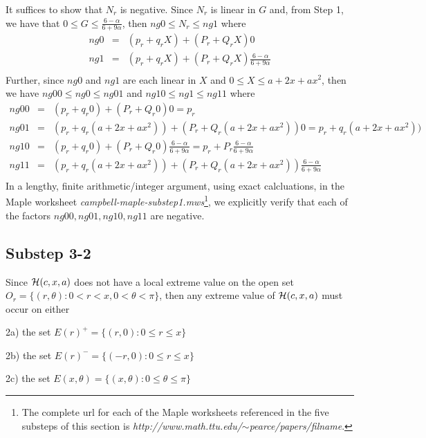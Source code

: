 \documentclass[12pt]{article}
\newcommand{\ds}{\displaystyle}
\begin{document}
It suffices to show that $N_r$ is negative. Since $N_r$ is linear in $G$ and, from Step 1, we have that 
${\ds 0 \le G \le \frac{6-\alpha}{6+9\alpha} }$, then $ng0 \le N_r \le ng1$
where
\begin{eqnarray*}
ng0 &=& (p_r + q_r  X) + (P_r + Q_r X)0 \\
ng1 &=& (p_r + q_r  X) + (P_r + Q_r X)\frac{6-\alpha}{6+9\alpha} \\
\end{eqnarray*}
Further, since $ng0$ and $ng1$ are each linear in $X$ and $0 \le X \le a + 2x + ax^2$, then we have
$ng00 \le ng0 \le ng01$ and $ng10 \le ng1 \le ng11$
where
\begin{eqnarray*}
ng00 &=& (p_r + q_r 0) + (P_r + Q_r 0)0  = p_r\\
ng01 &=& (p_r + q_r (a + 2x + ax^2)) + (P_r + Q_r (a + 2x + ax^2))0  = p_r + q_r (a + 2x + ax^2)) \\
ng10 &=& (p_r + q_r 0) + (P_r + Q_r 0)\frac{6-\alpha}{6+9\alpha} = p_r + P_r\frac{6-\alpha}{6+9\alpha} \\
ng11 &=& (p_r + q_r (a + 2x + ax^2)) + (P_r + Q_r (a + 2x + ax^2))\frac{6-\alpha}{6+9\alpha} \\
\end{eqnarray*}
In a lengthy, finite arithmetic/integer argument, using exact calcluations, in the Maple worksheet 
{\em campbell-maple-substep1.mws}\footnote{The complete url for each of the Maple worksheets referenced in the five substeps of this section is  
{\em http://www.math.ttu.edu/$\sim$pearce/papers/filname}.}, we explicitly verify that each of the factors \linebreak $ng00, ng01, ng10, ng11$ are negative.

\vspace{0.05in}

\subsection{Substep 3-2} Since ${\cal H}(c,x,a)$ does not have a local extreme value on the open 
set $O_r = \{(r,\theta) : 0 < r < x, 0 < \theta < \pi \}$, then any extreme value of ${\cal H}(c,x,a)$ must occur on either 

\vspace{0.05in}

2a) the set $E(r)^{+}= \{(r,0) : 0 \le r \le x \}$

2b) the set $E(r)^{-} =\{(-r,0) : 0 \le r \le x \}$

2c) the set $E(x,\theta) = \{(x,\theta) : 0 \le \theta \le \pi \}$
\end{document}
